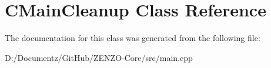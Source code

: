 \hypertarget{class_c_main_cleanup}{}\section{C\+Main\+Cleanup Class Reference}
\label{class_c_main_cleanup}


The documentation for this class was generated from the following file\+:\begin{DoxyCompactItemize}
\item 
D\+:/\+Documentz/\+Git\+Hub/\+Z\+E\+N\+Z\+O-\/\+Core/src/main.\+cpp\end{DoxyCompactItemize}
